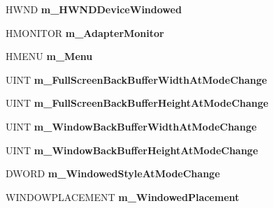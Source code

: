 \begin{DoxyCompactItemize}
\item 
\hypertarget{struct_d_x_u_t_state_1_1_s_t_a_t_e_a543f8fddc68bb0052eb4688964e8c8da}{H\+W\+N\+D {\bfseries m\+\_\+\+H\+W\+N\+D\+Device\+Windowed}}\label{struct_d_x_u_t_state_1_1_s_t_a_t_e_a543f8fddc68bb0052eb4688964e8c8da}

\item 
\hypertarget{struct_d_x_u_t_state_1_1_s_t_a_t_e_a71c6d350b032d377728ba18e5b90deed}{H\+M\+O\+N\+I\+T\+O\+R {\bfseries m\+\_\+\+Adapter\+Monitor}}\label{struct_d_x_u_t_state_1_1_s_t_a_t_e_a71c6d350b032d377728ba18e5b90deed}

\item 
\hypertarget{struct_d_x_u_t_state_1_1_s_t_a_t_e_a3bfc553b58cab27bee5d4f0c89ac4568}{H\+M\+E\+N\+U {\bfseries m\+\_\+\+Menu}}\label{struct_d_x_u_t_state_1_1_s_t_a_t_e_a3bfc553b58cab27bee5d4f0c89ac4568}

\item 
\hypertarget{struct_d_x_u_t_state_1_1_s_t_a_t_e_a5c05c68f55ddf278b7388237422738de}{U\+I\+N\+T {\bfseries m\+\_\+\+Full\+Screen\+Back\+Buffer\+Width\+At\+Mode\+Change}}\label{struct_d_x_u_t_state_1_1_s_t_a_t_e_a5c05c68f55ddf278b7388237422738de}

\item 
\hypertarget{struct_d_x_u_t_state_1_1_s_t_a_t_e_a48f78e048e08a5bd3cf4a43efea95cd0}{U\+I\+N\+T {\bfseries m\+\_\+\+Full\+Screen\+Back\+Buffer\+Height\+At\+Mode\+Change}}\label{struct_d_x_u_t_state_1_1_s_t_a_t_e_a48f78e048e08a5bd3cf4a43efea95cd0}

\item 
\hypertarget{struct_d_x_u_t_state_1_1_s_t_a_t_e_a047f50f98c491ef14122631b21a9658d}{U\+I\+N\+T {\bfseries m\+\_\+\+Window\+Back\+Buffer\+Width\+At\+Mode\+Change}}\label{struct_d_x_u_t_state_1_1_s_t_a_t_e_a047f50f98c491ef14122631b21a9658d}

\item 
\hypertarget{struct_d_x_u_t_state_1_1_s_t_a_t_e_a15a6987343f6dff13d430cf4dc58cef1}{U\+I\+N\+T {\bfseries m\+\_\+\+Window\+Back\+Buffer\+Height\+At\+Mode\+Change}}\label{struct_d_x_u_t_state_1_1_s_t_a_t_e_a15a6987343f6dff13d430cf4dc58cef1}

\item 
\hypertarget{struct_d_x_u_t_state_1_1_s_t_a_t_e_a87749bb43ec8abb327a2db7f7353f792}{D\+W\+O\+R\+D {\bfseries m\+\_\+\+Windowed\+Style\+At\+Mode\+Change}}\label{struct_d_x_u_t_state_1_1_s_t_a_t_e_a87749bb43ec8abb327a2db7f7353f792}

\item 
\hypertarget{struct_d_x_u_t_state_1_1_s_t_a_t_e_ad309dfdf17c0d15b5b0e154b91074eb9}{W\+I\+N\+D\+O\+W\+P\+L\+A\+C\+E\+M\+E\+N\+T {\bfseries m\+\_\+\+Windowed\+Placement}}\label{struct_d_x_u_t_state_1_1_s_t_a_t_e_ad309dfdf17c0d15b5b0e154b91074eb9}


\end{DoxyCompactItemize}

